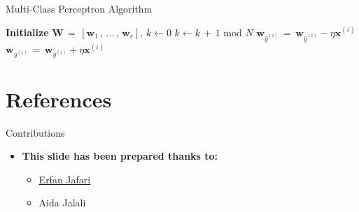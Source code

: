 \documentclass[serif, aspectratio=169]{beamer}
\begin{document}
    \begin{frame}{Multi-Class Perceptron Algorithm}

        \begin{algorithm}[H]
            \caption{Multi-class perceptron}\label{alg:Multi-class perceptron}
            \begin{algorithmic}[1]
                \State \textbf{Initialize} $\mathbf{W} \, = \, [\mathbf{w}_1 \, , \, ... \, , \, \mathbf{w}_c], \, k \leftarrow 0$
                    \State \(k \leftarrow k \, + \, 1 \text{ mod } N\)
                        \State \(\mathbf{w}_{\hat{y}^{(i)}} \, = \, \mathbf{w}_{\hat{y}^{(i)}} - \eta \mathbf{x}^{(i)}\)
                        \State \(\mathbf{w}_{y^{(i)}} \, = \, \mathbf{w}_{y^{(i)}} + \eta \mathbf{x}^{(i)}\)
                    \EndIf
                \EndWhile
            \end{algorithmic}
        \end{algorithm}

    \end{frame}


    \section{References}


    \begin{frame}{Contributions}
        \begin{itemize}
            \item \textbf{This slide has been prepared thanks to:}
            \medskip
            \begin{itemize}
                \item \href{https://github.com/jefri021}{Erfan Jafari}
                \item {Aida Jalali}
            \end{itemize}
        \end{itemize}

    \end{frame}


    \begin{frame}[allowframebreaks]
        
        
        \nocite{*} %
    \end{frame}
\end{document}
